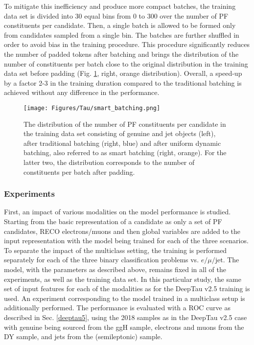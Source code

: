 To mitigate this inefficiency and produce more compact batches, the training data set is divided into 30 equal bins from 0 to 300 over the number of PF constituents per \tauh candidate. Then, a single batch is allowed to be formed only from \tauh candidates sampled from a single bin. The batches are further shuffled in order to avoid bias in the training procedure. This procedure significantly reduces the number of padded tokens after batching and brings the distribution of the number of constituents per batch close to the original distribution in the training data set before padding (Fig. \ref{fig:smart_batching}, right, orange distribution). Overall, a speed-up by a factor 2-3 in the training duration compared to the traditional batching is achieved without any difference in the performance. 
\begin{figure}[!t]
    \centering
    \texttt{[image: Figures/Tau/smart\_batching.png]}
    \caption{The distribution of the number of PF constituents per \tauh candidate in the training data set consisting of genuine \tauh and jet objects (left), after traditional batching (right, blue) and after uniform dynamic batching, also referred to as smart batching (right, orange). For the latter two, the distribution corresponds to the number of constituents per batch after padding.}
    \label{fig:smart_batching}
\end{figure}

\subsubsection{Experiments}

First, an impact of various modalities on the model performance is studied. Starting from the basic representation of a \tauh candidate as only a set of PF candidates, RECO electrons/muons and then global variables are added to the input representation with the model being trained for each of the three scenarios. To separate the impact of the multiclass setting, the training is performed separately for each of the three binary classification problems \tauh vs. $e/\mu/\text{jet}$. The model, with the parameters as described above, remains fixed in all of the experiments, as well as the training data set. In this particular study, the same set of input features for each of the modalities as for the DeepTau v2.5 training is used. An experiment corresponding to the model trained in a multiclass setup is additionally performed. The performance is evaluated with a ROC curve as described in Sec. \ref{deeptau5}, using the 2018 samples as in the DeepTau v2.5 case with genuine \tauh being sourced from the ggH sample, electrons and muons from the DY sample, and jets from the \ttbar (semileptonic) sample. 

